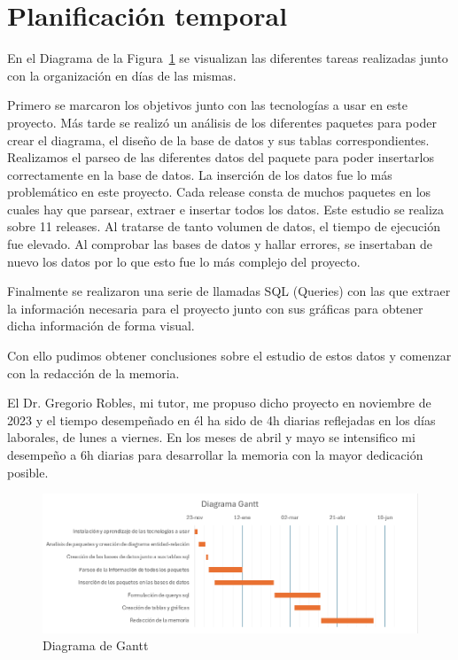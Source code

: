 \documentclass[a4paper, 12pt]{book}
\begin{document}
\section{Planificación temporal}
\label{sec:planificacion-temporal}

En el Diagrama de la Figura~\ref{fig:diagrama_gantt} se visualizan las diferentes tareas realizadas junto con la organización en días de las mismas. 

Primero se marcaron los objetivos junto con las tecnologías a usar en este proyecto.
Más tarde se realizó un análisis de los diferentes paquetes para poder crear el diagrama, el diseño de la base de datos y sus tablas correspondientes.
Realizamos el parseo de las diferentes datos del paquete para poder insertarlos correctamente en la base de datos.
La inserción de los datos fue lo más problemático en este proyecto. Cada release consta de muchos paquetes en los cuales hay que parsear, extraer e insertar todos los datos. Este estudio se realiza sobre 11 releases. Al tratarse de tanto volumen de datos, el tiempo de ejecución fue elevado. Al comprobar las bases de datos y hallar errores, se insertaban de nuevo los datos por lo que esto fue lo más complejo del proyecto.

Finalmente se realizaron una serie de llamadas SQL (Queries) con las que extraer la información necesaria para el proyecto junto con sus gráficas para obtener dicha información de forma visual.

Con ello pudimos obtener conclusiones sobre el estudio de estos datos y comenzar con la redacción de la memoria.

El Dr. Gregorio Robles, mi tutor, me propuso dicho proyecto en noviembre de 2023 y el tiempo desempeñado en él ha sido de 4h diarias reflejadas en los días laborales, de lunes a viernes. En los meses de abril y mayo se intensifico mi desempeño a 6h diarias para desarrollar la memoria con la mayor dedicación posible.

\begin{figure}
	\centering
	\includegraphics[width=17cm, keepaspectratio]{img/Gantt.png}
	\caption{Diagrama de Gantt}
	\label{fig:diagrama_gantt}
\end{figure}
\end{document}
